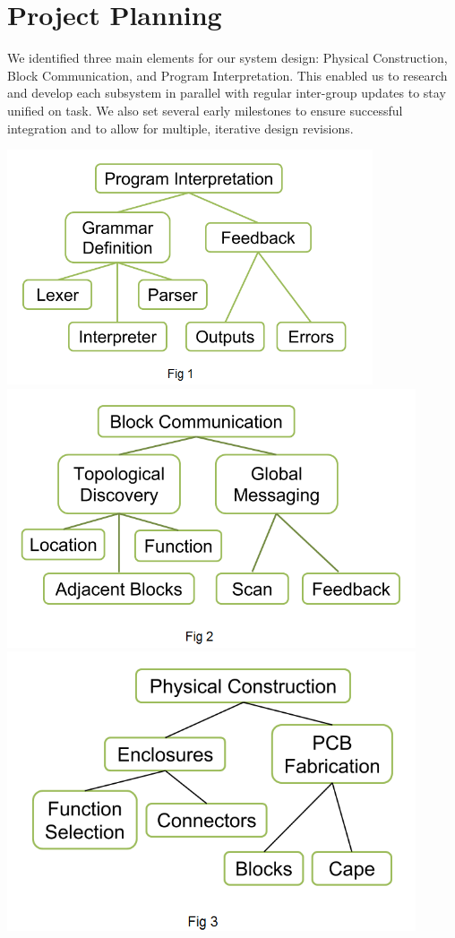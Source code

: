 \documentclass[12pt,a4paper]{article}
\begin{document}
\section{Project Planning}
We identified three main elements for our system design: Physical Construction, Block Communication, and Program Interpretation. This enabled us to research and develop each subsystem in parallel with regular inter-group updates to stay unified on task. We also set several early milestones to ensure successful integration and to allow for multiple, iterative design revisions.

\includegraphics[width=4.25in]{PI.png}\\
\newpage
\includegraphics[width=4.75in]{BC.png}\\

\includegraphics[width=4.75in]{PC.png}\\
\end{document}
